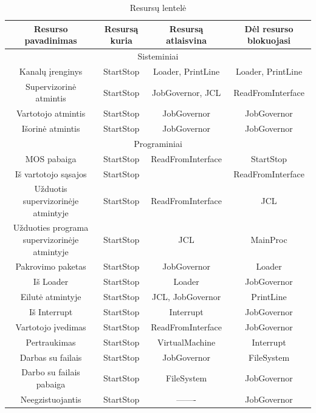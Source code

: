 \documentclass{VUMIFInfKursinis}
\begin{document}
\begin{table}[H]\footnotesize
	\centering
	\caption{Resursų lentelė}    %
	\begin{tabular}{|c|c|c|c|}
		\hline
		Resurso pavadinimas & Resursą kuria & Resursą atlaisvina & Dėl resurso blokuojasi \\
		\hline
		\multicolumn{4}{c}{Sisteminiai}\\
		\hline
		Kanalų įrenginys & StartStop & Loader, PrintLine & Loader, PrintLine\\
		\hline
		Supervizorinė atmintis & StartStop & JobGovernor, JCL & ReadFromInterface \\
		\hline
		Vartotojo atmintis & StartStop & JobGovernor & JobGovernor\\
		\hline
		Išorinė atmintis & StartStop & JobGovernor & JobGovernor \\
		\hline
		\multicolumn{4}{c}{Programiniai}\\
		\hline
		MOS pabaiga & StartStop & ReadFromInterface & StartStop \\
		\hline
		Iš vartotojo sąsajos & StartStop & & ReadFromInterface \\
		\hline
		Užduotis supervizorinėje atmintyje & StartStop & ReadFromInterface & JCL \\
		\hline
		Užduoties programa supervizorinėje atmintyje & StartStop & JCL & MainProc \\
		\hline
		Pakrovimo paketas & StartStop & JobGovernor & Loader \\
		\hline
		Iš Loader & StartStop & Loader & JobGovernor \\
		\hline
		Eilutė atmintyje & StartStop & JCL, JobGovernor & PrintLine\\
		\hline
		Iš Interrupt & StartStop & Interrupt & JobGovernor\\
		\hline
		Vartotojo įvedimas & StartStop & ReadFromInterface & JobGovernor \\
		\hline 
		Pertraukimas & StartStop & VirtualMachine & Interrupt\\
		\hline 
		Darbas su failais & StartStop & JobGovernor & FileSystem \\
		\hline
		Darbo su failais pabaiga & StartStop & FileSystem & JobGovernor \\
		\hline 
		Neegzistuojantis & StartStop & ------- & JobGovernor \\
		\hline
	\end{tabular}
	\label{tab:resursu_lentele}
\end{table}
\end{document}
